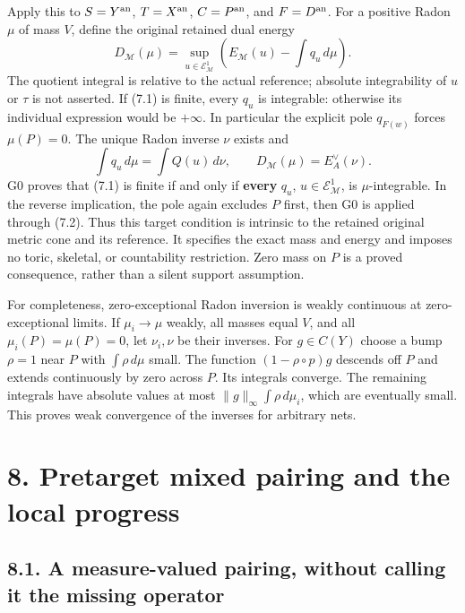 \documentclass[
  10pt,
]{article}
\begin{document}
Apply this to \(S=Y^{\rm an}\), \(T=X^{\rm an}\), \(C=P^{\rm an}\), and
\(F=D^{\rm an}\). For a positive Radon \(\mu\) of mass \(V\), define the
original retained dual energy
\[D_{\mathcal M}(\mu)=\sup_{u\in\mathcal E^1_{\mathcal M}}
\left(E_{\mathcal M}(u)-\int q_u\,d\mu\right).             \tag{7.1}\]
The quotient integral is relative to the actual reference; absolute
integrability of \(u\) or \(\tau\) is not asserted. If (7.1) is finite,
every \(q_u\) is integrable: otherwise its individual expression would
be \(+\infty\). In particular the explicit pole \(q_{F(w)}\) forces
\(\mu(P)=0\). The unique Radon inverse \(\nu\) exists and
\[\int q_u\,d\mu=\int Q(u)\,d\nu,\qquad
D_{\mathcal M}(\mu)=E_A^\vee(\nu).                       \tag{7.2}\] G0
proves that (7.1) is finite if and only if \textbf{every} \(q_u\),
\(u\in\mathcal E^1_{\mathcal M}\), is \(\mu\)-integrable. In the reverse
implication, the pole again excludes \(P\) first, then G0 is applied
through (7.2). Thus this target condition is intrinsic to the retained
original metric cone and its reference. It specifies the exact mass and
energy and imposes no toric, skeletal, or countability restriction. Zero
mass on \(P\) is a proved consequence, rather than a silent support
assumption.

For completeness, zero-exceptional Radon inversion is weakly continuous
at zero-exceptional limits. If \(\mu_i\to\mu\) weakly, all masses equal
\(V\), and all \(\mu_i(P)=\mu(P)=0\), let \(\nu_i,\nu\) be their
inverses. For \(g\in C(Y)\) choose a bump \(\rho=1\) near \(P\) with
\(\int\rho\,d\mu\) small. The function \((1-\rho\circ p)g\) descends off
\(P\) and extends continuously by zero across \(P\). Its integrals
converge. The remaining integrals have absolute values at most
\(\|g\|_\infty\int\rho\,d\mu_i\), which are eventually small. This
proves weak convergence of the inverses for arbitrary nets.

\section{8. Pretarget mixed pairing and the local
progress}\label{pretarget-mixed-pairing-and-the-local-progress}

\subsection{8.1. A measure-valued pairing, without calling it the
missing
operator}\label{a-measure-valued-pairing-without-calling-it-the-missing-operator}
\end{document}
